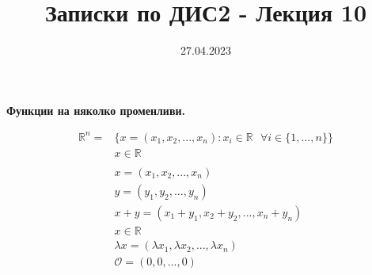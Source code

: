 \documentclass[12pt]{article}
\newcommand{\spc}{\text{ }}
\begin{document}
	\color{white}
	\pagecolor{darkgray}
	\title{Записки по ДИС2 - Лекция 10}
	\date{27.04.2023}
	\maketitle
	\begin{center}
		\Large
		\textbf{Функции на няколко променливи.}
	\end{center}
	
	\begin{align*}\mathbb{R}^{n} = &\{x=(x_1,x_2,...,x_n):x_i\in\mathbb{R} \spc\forall i\in\{1,...,n\}\}\\
	&x\in\mathbb{R}\\
	\spc\\
	&x=(x_1,x_2,...,x_n)\\
	&y=(y_1,y_2,...,y_n)\\
	&x+y=(x_1+y_1,x_2+y_2,...,x_n+y_n)\\
	&x\in\mathbb{R}\\
	&\lambda x =(\lambda x_1, \lambda x_2, ..., \lambda x_n)\\
	&\mathcal{O} = (0,0,...,0)\\
	\end{align*}
\end{document}
